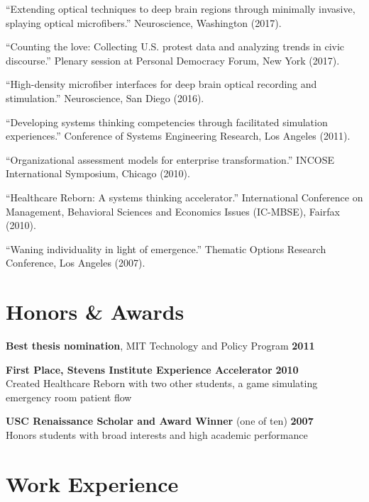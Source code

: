 \bigskip

\noindent
``Extending optical techniques to deep brain regions through minimally invasive, splaying optical microfibers.'' Neuroscience, Washington (2017).

\bigskip

\noindent
``Counting the love: Collecting U.S. protest data and analyzing trends in civic discourse.'' Plenary session at Personal Democracy Forum, New York (2017).

\bigskip

\noindent
``High-density microfiber interfaces for deep brain optical recording and stimulation.'' Neuroscience, San Diego (2016).

\bigskip

\noindent
``Developing systems thinking competencies through facilitated simulation experiences.'' Conference of Systems Engineering Research, Los Angeles (2011).

\bigskip

\noindent
``Organizational assessment models for enterprise transformation.'' INCOSE International Symposium, Chicago (2010).

\bigskip

\noindent
``Healthcare Reborn: A systems thinking accelerator.'' International Conference on Management, Behavioral Sciences and Economics Issues (IC-MBSE), Fairfax (2010).

\bigskip

\noindent
``Waning individuality in light of emergence.'' Thematic Options Research Conference, Los Angeles (2007).

\section*{Honors \& Awards}

\textbf{Best thesis nomination}, MIT Technology and Policy Program \hfill \textbf{2011}

\noindent
\textbf{First Place, Stevens Institute Experience Accelerator} \hfill \textbf{2010} \\
	Created Healthcare Reborn with two other students, a game simulating emergency room patient flow

\noindent
\textbf{USC Renaissance Scholar and Award Winner} (one of ten) \hfill \textbf{2007} \\
	Honors students with broad interests and high academic performance

\section*{Work Experience} 

